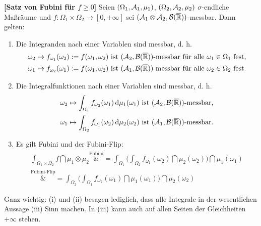 \begin{satz}\label{SatzFubini}
 \textbf{[Satz von Fubini f\"ur $f\geq0$]}
	Seien $(\Omega_1, \mathcal{A}_1, \mu_1)$, $(\Omega_2, \mathcal{A}_2, \mu_2)$ $\sigma$-endliche Maßräume und $f\colon \Omega_1 \times \Omega_2 \to [0,+\infty]$ sei $(\mathcal{A}_1 \otimes \mathcal{A}_2, \mathcal{B}(\overline{\mathbb{R}}))$-messbar. Dann gelten:
	\begin{enumerate}[label=(\roman*)]
		\item \label{FubOne} Die Integranden nach einer Variablen sind messbar, d. h.
		\begin{align*}
			\omega_2&\mapsto f_{\omega_1}(\omega_2) := f(\omega_1, \omega_2)\text{ ist }(\mathcal{A}_2, \mathcal{B}(\overline{\mathbb{R}}))\text{-messbar f\"ur alle }\omega_1\in \Omega_1\text{ fest,}\\
			\omega_1&\mapsto f_{\omega_2}(\omega_1) := f(\omega_1, \omega_2)\text{ ist }(\mathcal{A}_1, \mathcal{B}(\overline{\mathbb{R}}))\text{-messbar f\"ur alle }\omega_2\in \Omega_2\text{ fest.}
		\end{align*}
		\item Die Integralfunktionen nach einer Variablen sind messbar, d. h.
		 \begin{align*}
		 	\omega_2& \mapsto \int_{\Omega_1} f_{\omega_2}(\omega_1) \, \mathrm{d} \mu_1(\omega_1) \text{ ist } (\mathcal{A}_2, \mathcal{B}(\overline{\mathbb{R}}))\text{-messbar,}\\
			\omega_1 &\mapsto \int_{\Omega_2} f_{\omega_1}(\omega_2) \, \mathrm{d} \mu_2(\omega_2) \text{ ist } (\mathcal{A}_1, \mathcal{B}(\overline{\mathbb{R}}))\text{-messbar}.
		\end{align*}
		\item Es gilt Fubini und der Fubini-Flip:
		\begin{align*}
			\int_{\Omega_1 \times \Omega_2} f \dint \mu_1 \otimes \mu_2
			\overset{\text{Fubini}}&{=} \int_{\Omega_1}\Big( \int_{\Omega_2} f_{\omega_1}(\omega_2) \dint \mu_2(\omega_2) \Big) \dint \mu_1(\omega_1) \\
			\overset{\text{Fubini-Flip}}&{=} \int_{\Omega_2}\Big( \int_{\Omega_1} f_{\omega_2}(\omega_1) \dint \mu_1(\omega_1) \Big) \dint \mu_2(\omega_2) 
		\end{align*}
	\end{enumerate}
	Ganz wichtig: (i) und (ii) besagen lediglich, dass alle Integrale in der wesentlichen Aussage (iii) Sinn machen. In (iii) kann auch auf allen Seiten der Gleichheiten $+\infty$ stehen.
\end{satz}

